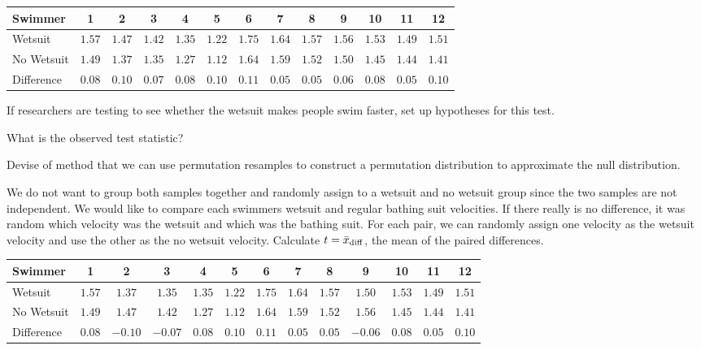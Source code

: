 \vspace{0.5in}

\begin{tabular}{|l||c|c|c|c|c|c|c|c|c|c|c|c|}
Swimmer & 1 & 2 & 3 & 4 & 5 & 6 & 7 & 8 & 9 & 10 & 11 & 12 \\
\hline
Wetsuit & $1.57$ & $1.47$ & $1.42$ & $1.35$ & $1.22$ & $1.75$ & $1.64$ & $1.57$ & $1.56$ & $1.53$ & $1.49$ & $1.51$ \\
No Wetsuit & $1.49$ & $1.37$ & $1.35$ & $1.27$ & $1.12$ & $1.64$ & $1.59$ & $1.52$ & $1.50$ & $1.45$ & $1.44$ & $1.41$ \\
\hline
Difference & $0.08$ &  $0.10$ &  $0.07$ &  $0.08$ &  $0.10$ & $0.11$ & $0.05$ & $0.05$ & $0.06$ & $0.08$ & $0.05$ &  $0.10$
\end{tabular}


\bb[resume]
\ii If researchers are testing to see whether the wetsuit makes people swim faster, set up hypotheses for this test. \vfill

\ii What is the observed test statistic? \vfill

\ii Devise of method that we can use permutation resamples to construct a permutation distribution to approximate the null distribution.\ee

\vfill

\clearpage

\bbox
\bi
\ii We do not want to group both samples together and randomly assign to a wetsuit and no wetsuit group since the two samples
are not independent.
\ii We would like to compare each swimmers wetsuit and regular bathing suit velocities.
\ii If there really is no difference, it was random which velocity was the wetsuit and which was the bathing suit.
\ii For each pair, we can randomly assign one velocity as the wetsuit velocity and use the other as the no wetsuit velocity.
\ii Calculate $t= \bar{x}_{\rm{diff}}$, the mean of the paired differences.
\ei
\ebox

\medskip
\begin{tabular}{l||c|c|c|c|c|c|c|c|c|c|c|c}
Swimmer & 1 & 2 & 3 & 4 & 5 & 6 & 7 & 8 & 9 & 10 & 11 & 12 \\
\hline
Wetsuit & $1.57$ & $\mathbf{1.37}$ & $\mathbf{1.35}$ & $1.35$ & $1.22$ & $1.75$ & $1.64$ & $1.57$ & $\mathbf{1.50}$ & $1.53$ & $1.49$ & $1.51$ \\
No Wetsuit & $1.49$ & $\mathbf{1.47}$ & $\mathbf{1.42}$ & $1.27$ & $1.12$ & $1.64$ & $1.59$ & $1.52$ & $\mathbf{1.56}$ & $1.45$ & $1.44$ & $1.41$ \\
\hline
Difference & $0.08$ &  $\mathbf{-0.10}$ &  $\mathbf{-0.07}$ &  $0.08$ &  $0.10$ & $0.11$ & $0.05$ & $0.05$ & $\mathbf{-0.06}$ & $0.08$ & $0.05$ &  $0.10$
\end{tabular}

